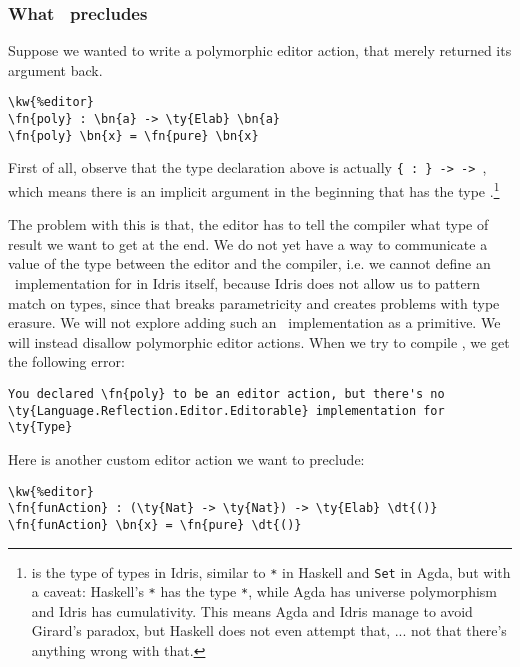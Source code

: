 \subsubsection{What \Editorable\ precludes}

Suppose we wanted to write a polymorphic editor action, that merely returned its argument back.

\begin{Verbatim}[framesep=2mm, label=\footnotesize{\normalfont{Idris}}, labelposition=topline]
\kw{%editor}
\fn{poly} : \bn{a} -> \ty{Elab} \bn{a}
\fn{poly} \bn{x} = \fn{pure} \bn{x}
\end{Verbatim}

First of all, observe that the type declaration above is actually
\texttt{\{ : \} ->  ->  }, which means
there is an implicit argument in the beginning that has the type
.\footnote{ is the type of types in Idris, similar to
\texttt{*} in Haskell and \texttt{Set} in Agda, but with a caveat:
Haskell's \texttt{*} has the type \texttt{*}\cite{eisenberg}, while Agda has universe
polymorphism and Idris has cumulativity. This means Agda and Idris manage to
avoid Girard's paradox, but Haskell does not even attempt that, ... not that
there's anything wrong with that.}

The problem with this is that, the editor has to tell the compiler what type of
result we want to get at the end. We do not yet have a way to communicate a
value of the type  between the editor and the compiler, i.e. we cannot
define an \Editorable\ implementation for  in Idris itself, because
Idris does not allow us to pattern match on types, since that breaks
parametricity and creates problems with type erasure.\cite{universePat}
We will not explore adding such an \Editorable\ implementation as a primitive.
We will instead disallow polymorphic editor actions.
When we try to compile , we get the following error:

\begin{Verbatim}[framesep=2mm, label=\footnotesize{\normalfont{Idris error message}}, labelposition=topline]
You declared \fn{poly} to be an editor action, but there's no
\ty{Language.Reflection.Editor.Editorable} implementation for \ty{Type}
\end{Verbatim}

Here is another custom editor action we want to preclude:

\begin{Verbatim}[framesep=2mm, label=\footnotesize{\normalfont{Idris}}, labelposition=topline]
\kw{%editor}
\fn{funAction} : (\ty{Nat} -> \ty{Nat}) -> \ty{Elab} \dt{()}
\fn{funAction} \bn{x} = \fn{pure} \dt{()}
\end{Verbatim}

